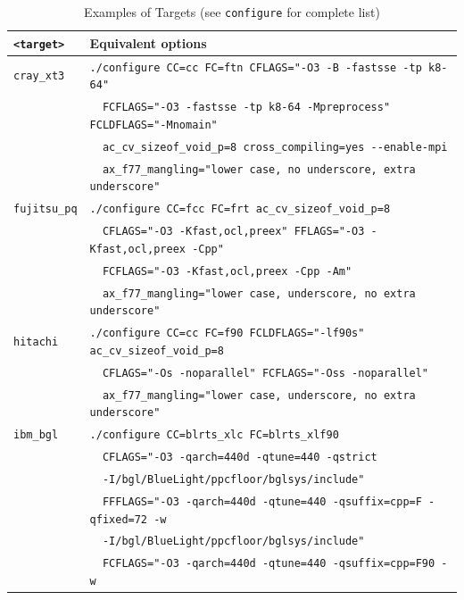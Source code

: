 \documentclass[a4paper]{article}
\begin{document}
\begin{table}[htbp]
\caption{Examples of Targets (see {\tt configure} for complete list)}
\label{targetoption}
\begin{center}
\begin{tabular}{|l|l|}
\hline
\verb+<target>+       & Equivalent options \\ \hline
\verb+cray_xt3+       & \verb+./configure CC=cc FC=ftn CFLAGS="-O3 -B -fastsse -tp k8-64"+ \\
                      & \verb+  FCFLAGS="-O3 -fastsse -tp k8-64 -Mpreprocess" FCLDFLAGS="-Mnomain"+\\
                      & \verb+  ac_cv_sizeof_void_p=8 cross_compiling=yes --enable-mpi+\\
                      & \verb+  ax_f77_mangling="lower case, no underscore, extra underscore"+ \\ \hline
\verb+fujitsu_pq+     & \verb|./configure CC=fcc FC=frt ac_cv_sizeof_void_p=8| \\
                      & \verb+  CFLAGS="-O3 -Kfast,ocl,preex" FFLAGS="-O3 -Kfast,ocl,preex -Cpp"+ \\
                      & \verb+  FCFLAGS="-O3 -Kfast,ocl,preex -Cpp -Am"+\\
                      & \verb+  ax_f77_mangling="lower case, underscore, no extra underscore"+ \\ \hline
\verb+hitachi+        & \verb|./configure CC=cc FC=f90 FCLDFLAGS="-lf90s" ac_cv_sizeof_void_p=8| \\
                      & \verb+  CFLAGS="-Os -noparallel" FCFLAGS="-Oss -noparallel"+ \\
                      & \verb+  ax_f77_mangling="lower case, underscore, no extra underscore" + \\ \hline
\verb+ibm_bgl+        & \verb+./configure CC=blrts_xlc FC=blrts_xlf90+ \\
                      & \verb+  CFLAGS="-O3 -qarch=440d -qtune=440 -qstrict+ \\
                      & \verb+  -I/bgl/BlueLight/ppcfloor/bglsys/include"+ \\
                      & \verb+  FFFLAGS="-O3 -qarch=440d -qtune=440 -qsuffix=cpp=F -qfixed=72 -w+ \\
                      & \verb+  -I/bgl/BlueLight/ppcfloor/bglsys/include"+ \\
                      & \verb+  FCFLAGS="-O3 -qarch=440d -qtune=440 -qsuffix=cpp=F90 -w+ \\

\end{tabular}
\end{center}
\end{table}
\end{document}

